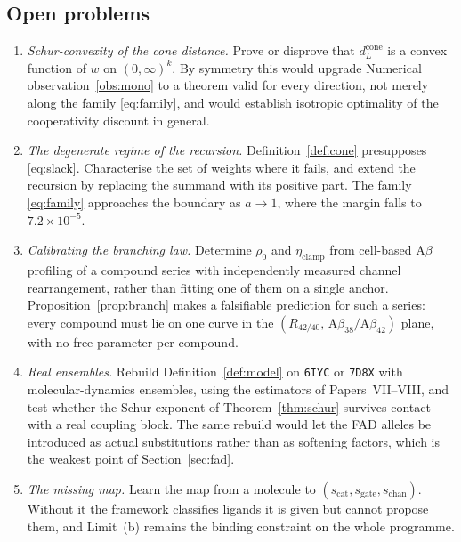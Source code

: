 \documentclass[11pt,reqno]{amsart}
\theoremstyle{plain}
\theoremstyle{definition}
\theoremstyle{remark}
\numberwithin{equation}{section}
\newcommand{\dcone}{d_L^{\mathrm{cone}}}
\newcommand{\Ab}{\mathrm{A}\beta}
\begin{document}
\subsection{Open problems}
\begin{enumerate}[label=\textup{(\arabic*)},leftmargin=2.4em,itemsep=4pt]
\item\label{op:schur} \emph{Schur-convexity of the cone distance.} Prove or disprove that $\dcone$ is a convex function of $w$ on $(0,\infty)^k$. By symmetry this would upgrade Numerical observation~\ref{obs:mono} to a theorem valid for every direction, not merely along the family \eqref{eq:family}, and would establish isotropic optimality of the cooperativity discount in general.
\item \emph{The degenerate regime of the recursion.} Definition~\ref{def:cone} presupposes \eqref{eq:slack}. Characterise the set of weights where it fails, and extend the recursion by replacing the summand with its positive part. The family \eqref{eq:family} approaches the boundary as $a\to1$, where the margin falls to $7.2\times10^{-5}$.
\item \emph{Calibrating the branching law.} Determine $\rho_0$ and $\eta_{\mathrm{clamp}}$ from cell-based $\Ab$ profiling of a compound series with independently measured channel rearrangement, rather than fitting one of them on a single anchor. Proposition~\ref{prop:branch} makes a falsifiable prediction for such a series: every compound must lie on one curve in the $(R_{42/40},\,\Ab_{38}/\Ab_{42})$ plane, with no free parameter per compound.
\item \emph{Real ensembles.} Rebuild Definition~\ref{def:model} on \texttt{6IYC} or \texttt{7D8X} with molecular-dynamics ensembles, using the estimators of Papers~VII--VIII, and test whether the Schur exponent of Theorem~\ref{thm:schur} survives contact with a real coupling block. The same rebuild would let the FAD alleles be introduced as actual substitutions rather than as softening factors, which is the weakest point of Section~\ref{sec:fad}.
\item \emph{The missing map.} Learn the map from a molecule to $(s_{\mathrm{cat}},s_{\mathrm{gate}},s_{\mathrm{chan}})$. Without it the framework classifies ligands it is given but cannot propose them, and Limit~(b) remains the binding constraint on the whole programme.
\end{enumerate}
\end{document}
